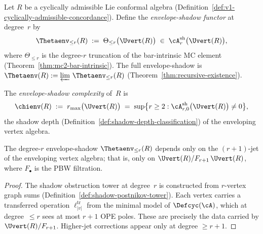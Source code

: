 \begin{definition}
\label{def:envelope-shadow-functor-concordance}
Let $R$ be a cyclically admissible Lie conformal algebra
(Definition~\ref{def:v1-cyclically-admissible-concordance}).
Define the \emph{envelope-shadow functor} at degree~$r$ by
\begin{equation}\label{eq:envelope-shadow-functor-concordance}
\Thetaenv_{\leq r}(R)
\;:=\;
\Theta_{\leq r}\bigl(\Uvert(R)\bigr)
\;\in\;
\cA^{\mathrm{sh}}_r\bigl(\Uvert(R)\bigr),
\end{equation}
where $\Theta_{\leq r}$ is the degree-$r$ truncation of the
bar-intrinsic MC element
(Theorem~\textup{\ref{thm:mc2-bar-intrinsic}}).
The full envelope-shadow is
$\Thetaenv(R) := \varprojlim\, \Thetaenv_{\leq r}(R)$
(Theorem~\textup{\ref{thm:recursive-existence}}).
\end{definition}

\begin{definition}
\label{def:envelope-shadow-complexity-concordance}
The \emph{envelope-shadow complexity} of~$R$ is
\begin{equation}\label{eq:envelope-shadow-complexity-concordance}
\chienv(R)
\;:=\;
r_{\max}\bigl(\Uvert(R)\bigr)
\;=\;
\sup\bigl\{r \ge 2 :
\cA^{\mathrm{sh}}_{r,0}\bigl(\Uvert(R)\bigr) \neq 0
\bigr\},
\end{equation}
the shadow depth
(Definition~\textup{\ref{def:shadow-depth-classification}})
of the enveloping vertex algebra.
\end{definition}

\begin{proposition}
\label{prop:finite-jet-rigidity}
\ClaimStatusProvedHere
{}
The degree-$r$ envelope-shadow $\Thetaenv_{\leq r}(R)$
depends only on the $(r{+}1)$-jet of the enveloping vertex
algebra; that is, only on
$\Uvert(R) / F_{r+1}\,\Uvert(R)$,
where $F_\bullet$ is the PBW filtration.
\end{proposition}

\begin{proof}
The shadow obstruction tower at degree~$r$ is constructed from
$r$-vertex graph sums
(Definition~\ref{def:shadow-postnikov-tower}).
Each vertex carries a transferred operation
$\ell_{|v|}^{\mathrm{tr}}$ from the minimal model of
$\Defcyc(\cA)$, which at degree~$\leq r$ sees at most
$r{+}1$ OPE poles. These are precisely the data carried
by $\Uvert(R)/F_{r+1}$. Higher-jet corrections appear
only at degree $\geq r{+}1$.
\end{proof}

